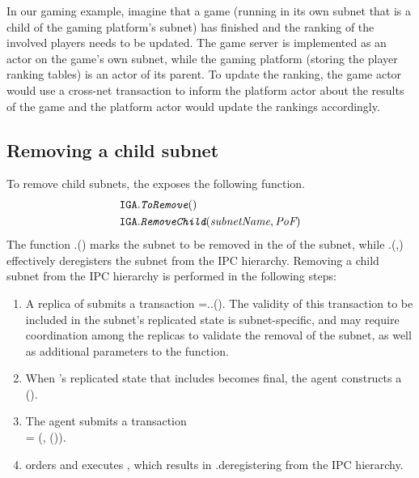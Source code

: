 \begin{example}

In our gaming example, imagine that a game (running in its own subnet that is a child of the gaming platform's subnet) has finished and the ranking of the involved players needs to be updated.
The game server is implemented as an actor on the game's own subnet, while the gaming platform (storing the player ranking tables) is an actor of its parent.
To update the ranking, the game actor would use a cross-net transaction to inform the platform actor about the results of the game and the platform actor would update the rankings accordingly.

\end{example}

\subsection{Removing a child subnet}
\label{sec:remove}


To remove child subnets, the \gw exposes the following function.
\begin{align*}
    \texttt{IGA}.&\textit{\texttt{ToRemove}}()\\
    \texttt{IGA}.&\textit{\texttt{RemoveChild}}(\textit{subnetName},\textit{PoF})
\end{align*}
The function \gw.() marks the subnet to be removed in the \gw of the subnet, while \gw.(,\pof) effectively deregisters the subnet from the IPC hierarchy. Removing a child subnet  from the IPC hierarchy is performed in the following steps:
\begin{enumerate}
\item A replica of  submits a transaction =.\gw.(). The validity of this transaction to be included in the subnet's replicated state is subnet-specific, and may require coordination among the replicas to validate the removal of the subnet, as well as additional parameters to the function.
\item When 's replicated state that includes  becomes final, the \ipc agent constructs a {\pof}().
    
    \item The \ipc agent submits a transaction\\
     = (, {\pof}()).
    
    \item {} orders and executes , which results in .\gw deregistering  from the IPC hierarchy.
\end{enumerate}

